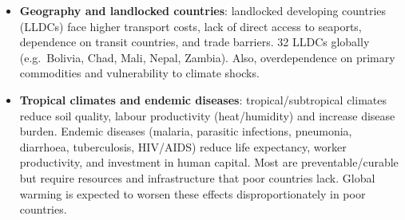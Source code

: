 \documentclass[a4paper,12pt]{article}
\begin{document}
\begin{itemize}
\begin{itemize}
    \item Oil-exporting countries deposited their new revenues in commercial banks in developed countries; the banks then aggressively \textbf{recycled these ``petrodollars''} as loans to developing countries. Lending was often imprudent, partly because banks assumed the public sector would cover losses. Loan funds were sometimes wasted on inefficient public enterprises, low tax collection, or corruption.
    \item After the \textbf{second oil shock (1979)}, countries either borrowed more or adopted restrictive fiscal/monetary policies; by the \textbf{early 1980s}, several Latin American and sub-Saharan African countries were on the verge of bankruptcy. From \textbf{1982}, the IMF, World Bank and US government intervened to prevent defaults (see the IMF/World Bank discussion in the strategies section).
  \end{itemize}
  \item \textbf{Geography and landlocked countries}: landlocked developing countries (LLDCs) face higher transport costs, lack of direct access to seaports, dependence on transit countries, and trade barriers. 32 LLDCs globally (e.g.\ Bolivia, Chad, Mali, Nepal, Zambia). Also, overdependence on primary commodities and vulnerability to climate shocks.
  \item \textbf{Tropical climates and endemic diseases}: tropical/subtropical climates reduce soil quality, labour productivity (heat/humidity) and increase disease burden. Endemic diseases (malaria, parasitic infections, pneumonia, diarrhoea, tuberculosis, HIV/AIDS) reduce life expectancy, worker productivity, and investment in human capital. Most are preventable/curable but require resources and infrastructure that poor countries lack. Global warming is expected to worsen these effects disproportionately in poor countries.
\end{itemize}
\end{document}

